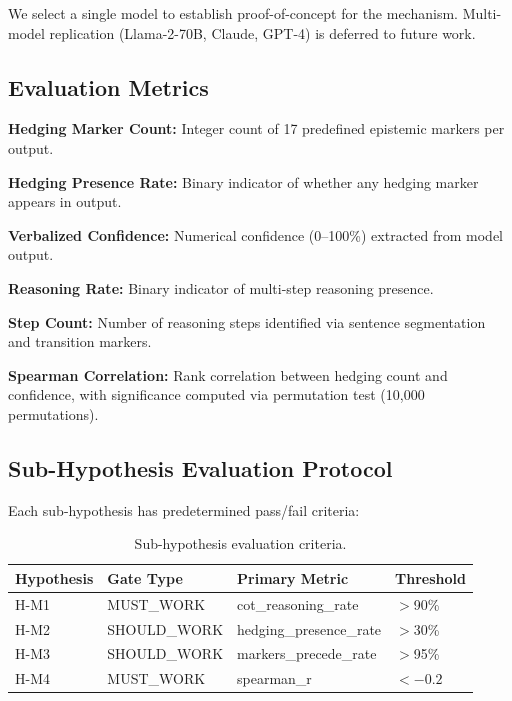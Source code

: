 We select a single model to establish proof-of-concept for the mechanism. Multi-model replication (Llama-2-70B, Claude, GPT-4) is deferred to future work.

\subsection{Evaluation Metrics}

\textbf{Hedging Marker Count:} Integer count of 17 predefined epistemic markers per output.

\textbf{Hedging Presence Rate:} Binary indicator of whether any hedging marker appears in output.

\textbf{Verbalized Confidence:} Numerical confidence (0--100\%) extracted from model output.

\textbf{Reasoning Rate:} Binary indicator of multi-step reasoning presence.

\textbf{Step Count:} Number of reasoning steps identified via sentence segmentation and transition markers.

\textbf{Spearman Correlation:} Rank correlation between hedging count and confidence, with significance computed via permutation test (10,000 permutations).

\subsection{Sub-Hypothesis Evaluation Protocol}

Each sub-hypothesis has predetermined pass/fail criteria:

\begin{table}[h]
\centering
\begin{tabular}{llll}
\toprule
Hypothesis & Gate Type & Primary Metric & Threshold \\
\midrule
H-M1 & MUST\_WORK & cot\_reasoning\_rate & $>$90\% \\
H-M2 & SHOULD\_WORK & hedging\_presence\_rate & $>$30\% \\
H-M3 & SHOULD\_WORK & markers\_precede\_rate & $>$95\% \\
H-M4 & MUST\_WORK & spearman\_r & $< -0.2$ \\
\bottomrule
\end{tabular}
\caption{Sub-hypothesis evaluation criteria.}
\label{tab:evaluation_criteria}
\end{table}
